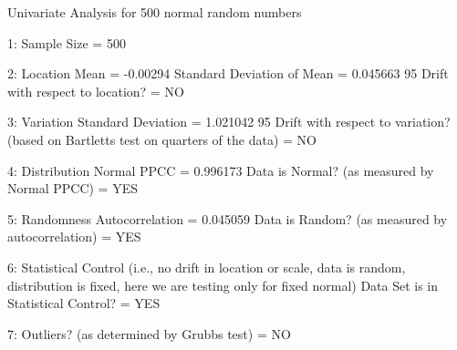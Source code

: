   
  
 Univariate Analysis for 500 normal random numbers
  
 1: Sample Size                           = 500
  
 2: Location
    Mean                                  = -0.00294
    Standard Deviation of Mean            = 0.045663
    95%
    Drift with respect to location?       = NO
  
 3: Variation
    Standard Deviation                    = 1.021042
    95%
    Drift with respect to variation?
    (based on Bartletts test on quarters
    of the data)                          = NO
  
 4: Distribution
    Normal PPCC                           = 0.996173
    Data is Normal?
      (as measured by Normal PPCC)        = YES
  
 5: Randomness
    Autocorrelation                       = 0.045059
    Data is Random?
      (as measured by autocorrelation)    = YES
  
 6: Statistical Control
    (i.e., no drift in location or scale,
    data is random, distribution is 
    fixed, here we are testing only for
    fixed normal)
    Data Set is in Statistical Control?   = YES
  
 7: Outliers?
    (as determined by Grubbs test)        = NO
  
